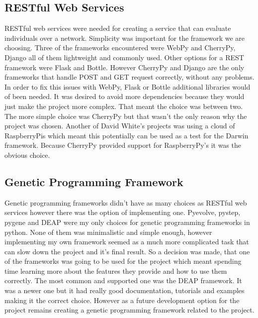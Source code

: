 \subsection{RESTful Web Services} 
RESTful web services were needed for creating a service that can evaluate individuals over a network. Simplicity was important for the framework we are
choosing. Three of the frameworks encountered were WebPy and CherryPy, Django all of them lightweight and commonly used. Other options for a REST framework were Flask and Bottle.
However CherryPy and Django are the only frameworks that handle POST and GET request correctly, without any problems. In order to fix this issues with WebPy, Flask or Bottle additional
libraries would of been needed. It was desired to avoid more dependencies because they would just make the project more complex. That meant the choice was between two. The more simple
choice was CherryPy but that wasn't the only reason why the project was chosen. Another of David White's projects was using a cloud of RaspberryPis which meant this potentially can
be used as a test for the Darwin framework. Because CherryPy provided support for RaspberryPy's it was the obvious choice.
\paragraph{}
\subsection{Genetic Programming Framework}
Genetic programming frameworks didn't have as many choices as RESTful web services however there was the option of implementing one.  Pyevolve, pystep, pygene and DEAP were 
my only choices for genetic programming frameworks in python. None of them was minimalistic and simple enough, however implementing my own framework seemed as a much more complicated task
that can slow down the project and it's final result. So a decision was made, that one of the frameworks was going to be used for the project which meant spending time learning more about
the features they provide and how to use them correctly. The most common and supported one was
the DEAP framework. It was a newer one but it had really good documentation, tutorials and examples making it the correct choice. However as a future development option for the project
remains creating a genetic programming framework related to the project.
\paragraph{}
